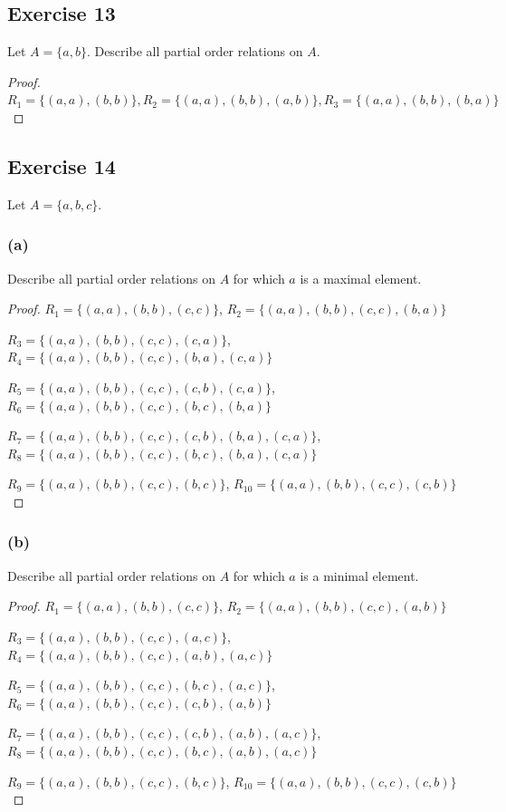 \documentclass[14pt]{extarticle}
\begin{document}
\subsection{Exercise 13}
Let \(A = \{a, b\}\). Describe all partial order relations on \(A\).

\begin{proof}
\(R_1 = \{(a, a), (b, b)\}, R_2 = \{(a, a), (b, b), (a, b)\}, R_3 = \{(a, a), (b, b), (b, a)\}\)
\end{proof}

\subsection{Exercise 14}
Let \(A = \{a, b, c\}\).

\subsubsection{(a)}
Describe all partial order relations on \(A\) for which \(a\) is a maximal element.

\begin{proof}
\(R_1 = \{(a, a), (b, b), (c, c)\}\), \(R_2 = \{(a, a), (b, b), (c, c), (b, a)\}\)

\(R_3 = \{(a, a), (b, b), (c, c), (c, a)\}\), \(R_4 = \{(a, a), (b, b), (c, c), (b, a), (c, a)\}\)

\(R_5 = \{(a, a), (b, b), (c, c), (c, b), (c, a)\}\), \(R_6 = \{(a, a), (b, b), (c, c), (b, c), (b, a)\}\)

\(R_7 = \{(a, a), (b, b), (c, c), (c, b), (b, a), (c, a)\}\), \(R_8 = \{(a, a), (b, b), (c, c), (b, c), (b, a), (c, a)\}\)

\(R_9 = \{(a, a), (b, b), (c, c), (b, c)\}\), \(R_{10} = \{(a, a), (b, b), (c, c), (c, b)\}\)
\end{proof}

\subsubsection{(b)}
Describe all partial order relations on \(A\) for which \(a\) is a minimal element.

\begin{proof}
\(R_1 = \{(a, a), (b, b), (c, c)\}\), \(R_2 = \{(a, a), (b, b), (c, c), (a, b)\}\)

\(R_3 = \{(a, a), (b, b), (c, c), (a, c)\}\), \(R_4 = \{(a, a), (b, b), (c, c), (a, b), (a, c)\}\)

\(R_5 = \{(a, a), (b, b), (c, c), (b, c), (a, c)\}\), \(R_6 = \{(a, a), (b, b), (c, c), (c, b), (a, b)\}\)

\(R_7 = \{(a, a), (b, b), (c, c), (c, b), (a, b), (a, c)\}\), \(R_8 = \{(a, a), (b, b), (c, c), (b, c), (a, b), (a, c)\}\)

\(R_9 = \{(a, a), (b, b), (c, c), (b, c)\}\), \(R_{10} = \{(a, a), (b, b), (c, c), (c, b)\}\)

\end{proof}
\end{document}
